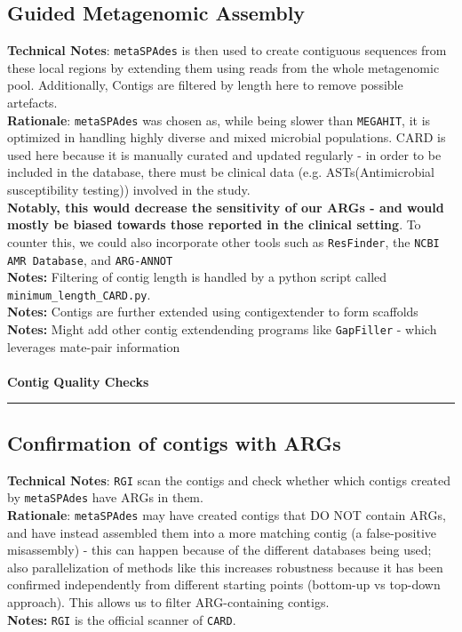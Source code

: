 \documentclass[11pt]{report}
\begin{document}
\subsection{Guided Metagenomic Assembly}
\textbf{Technical Notes}: \texttt{metaSPAdes} is then used to create contiguous sequences from these local regions by extending them using reads from the whole metagenomic pool. Additionally, Contigs are filtered by length here to remove possible artefacts. \\
\textbf{Rationale}: \texttt{metaSPAdes} was chosen as, while being slower than \texttt{MEGAHIT}, it is optimized in handling highly diverse and mixed microbial populations. CARD is used here because it is manually curated and updated regularly - in order to be included in the database, there must be clinical data (e.g. ASTs(Antimicrobial susceptibility testing)) involved in the study.
\\	 \textbf{Notably, this would decrease the sensitivity of our ARGs - and would mostly be biased towards those reported in the clinical setting}. To counter this, we could also incorporate other tools such as \texttt{ResFinder}, the \texttt{NCBI AMR Database}, and \texttt{ARG-ANNOT}
\\	\textbf{Notes:} Filtering of contig length is handled by a python script called \texttt{minimum\_length\_CARD.py}.
\\	\textbf{Notes:} Contigs are further extended using contigextender to form scaffolds 
\\	\textbf{Notes:} Might add other contig extendending programs like \texttt{GapFiller} - which leverages mate-pair information 
\\
\\
\textbf{Contig Quality Checks} \\
\rule{\linewidth}{0.5mm}
	
\subsection{Confirmation of contigs with ARGs}
\textbf{Technical Notes}: \texttt{RGI} scan the contigs and check whether which contigs created by \texttt{metaSPAdes} have ARGs in them. \\
\textbf{Rationale}: \texttt{metaSPAdes} may have created contigs that DO NOT contain ARGs, and have instead assembled them into a more matching contig (a false-positive misassembly) - this can happen because of the different databases being used; also parallelization of methods like this increases robustness because it has been confirmed independently from different starting points (bottom-up vs top-down approach). This allows us to filter ARG-containing contigs. \\
\textbf{Notes:} \texttt{RGI} is the official scanner of \texttt{CARD}.
\end{document}
